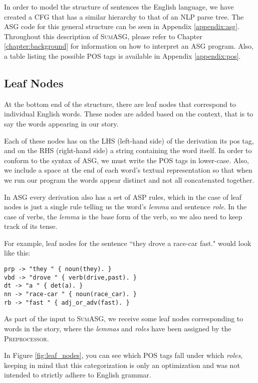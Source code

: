 In order to model the structure of sentences the English language, we have created a CFG that has a similar hierarchy to that of an NLP parse tree. The ASG code for this general structure can be seen in Appendix \ref{appendix:asg}. Throughout this description of \textsc{SumASG}, please refer to Chapter \ref{chapter:background} for information on how to interpret an ASG program. Also, a table listing the possible POS tags is available in Appendix \ref{appendix:pos}.

\subsection{Leaf Nodes}

At the bottom end of the structure, there are leaf nodes that correspond to individual English words. These nodes are added based on the context, that is to say the words appearing in our story.

Each of these nodes has on the LHS (left-hand side) of the derivation its pos tag, and on the RHS (right-hand side) a string containing the word itself. In order to conform to the syntax of ASG, we must write the POS tags in lower-case. Also, we include a space at the end of each word's textual representation so that when we run our program the words appear distinct and not all concatenated together.

In ASG every derivation also has a set of ASP rules, which in the case of leaf nodes is just a single rule telling us the word's \textit{lemma} and sentence \textit{role}. In the case of verbs, the \textit{lemma} is the base form of the verb, so we also need to keep track of its tense.

For example, leaf nodes for the sentence ``they drove a race-car fast." would look like this:

\begin{displayquote}
\begin{lstlisting}
prp -> "they " { noun(they). }
vbd -> "drove " { verb(drive,past). }
dt -> "a " { det(a). }
nn -> "race-car " { noun(race_car). }
rb -> "fast " { adj_or_adv(fast). }
\end{lstlisting}
\end{displayquote}

As part of the input to \textsc{SumASG}, we receive some leaf nodes corresponding to words in the story, where the \textit{lemmas} and \textit{roles} have been assigned by the \textsc{Preprocessor}.

In Figure \ref{fig:leaf_nodes}, you can see which POS tags fall under which \textit{roles}, keeping in mind that this categorization is only an optimization and was not intended to strictly adhere to English grammar.

